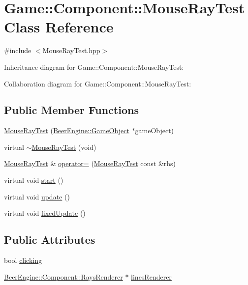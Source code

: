 \hypertarget{class_game_1_1_component_1_1_mouse_ray_test}{}\section{Game\+:\+:Component\+:\+:Mouse\+Ray\+Test Class Reference}
\label{class_game_1_1_component_1_1_mouse_ray_test}


{\ttfamily \#include $<$Mouse\+Ray\+Test.\+hpp$>$}



Inheritance diagram for Game\+:\+:Component\+:\+:Mouse\+Ray\+Test\+:


Collaboration diagram for Game\+:\+:Component\+:\+:Mouse\+Ray\+Test\+:
\subsection*{Public Member Functions}
\begin{DoxyCompactItemize}
\item 
\mbox{\hyperlink{class_game_1_1_component_1_1_mouse_ray_test_a99877b8b30c5523e5ccd69998fcbf866}{Mouse\+Ray\+Test}} (\mbox{\hyperlink{class_beer_engine_1_1_game_object}{Beer\+Engine\+::\+Game\+Object}} $\ast$game\+Object)
\item 
virtual \mbox{\hyperlink{class_game_1_1_component_1_1_mouse_ray_test_ad20ea199276f520e5d18adf17cea8293}{$\sim$\+Mouse\+Ray\+Test}} (void)
\item 
\mbox{\hyperlink{class_game_1_1_component_1_1_mouse_ray_test}{Mouse\+Ray\+Test}} \& \mbox{\hyperlink{class_game_1_1_component_1_1_mouse_ray_test_adf6a006015555e1754ec1948bc10637b}{operator=}} (\mbox{\hyperlink{class_game_1_1_component_1_1_mouse_ray_test}{Mouse\+Ray\+Test}} const \&rhs)
\item 
virtual void \mbox{\hyperlink{class_game_1_1_component_1_1_mouse_ray_test_ae0d25b167dd28084ddd677b0593a54f3}{start}} ()
\item 
virtual void \mbox{\hyperlink{class_game_1_1_component_1_1_mouse_ray_test_af5bf853e25dd4e70386dfecd4dc7dab9}{update}} ()
\item 
virtual void \mbox{\hyperlink{class_game_1_1_component_1_1_mouse_ray_test_a71fe0d523b05a8d42c7c79101ea5ad18}{fixed\+Update}} ()
\end{DoxyCompactItemize}
\subsection*{Public Attributes}
\begin{DoxyCompactItemize}
\item 
bool \mbox{\hyperlink{class_game_1_1_component_1_1_mouse_ray_test_a526049c590ec69e6dcdbf127aaa0a244}{clicking}}
\item 
\mbox{\hyperlink{class_beer_engine_1_1_component_1_1_rays_renderer}{Beer\+Engine\+::\+Component\+::\+Rays\+Renderer}} $\ast$ \mbox{\hyperlink{class_game_1_1_component_1_1_mouse_ray_test_a0c6d4f0a878531fcfc83add4258b8eae}{lines\+Renderer}}
\end{DoxyCompactItemize}
